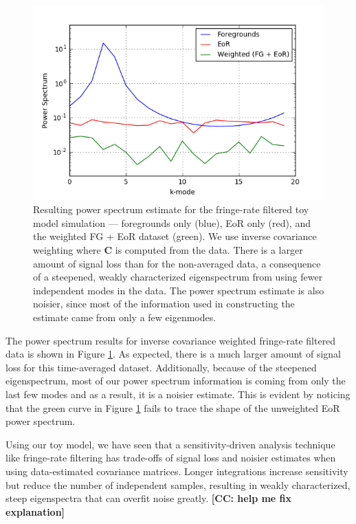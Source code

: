 \documentclass[preprint2,numberedappendix,tighten]{aastex6}  %
\newcommand{\cc}[1]{{\color{purple} \textbf{[CC: #1]}}}
\begin{document}
\begin{figure}
	\centering
	\includegraphics[trim={0.3cm 0.2cm 0.3cm 0.3cm},clip,width=\columnwidth]{plots/toy_sigloss7.png}
	\caption{Resulting power spectrum estimate for the fringe-rate filtered toy model simulation --- foregrounds only (blue), EoR only (red), and the weighted FG + EoR dataset (green). We use inverse covariance weighting where $\textbf{C}$ is computed from the data. There is a larger amount of signal loss than for the non-averaged data, a consequence of a steepened, weakly characterized eigenspectrum from using fewer independent modes in the data. The power spectrum estimate is also noisier, since most of the information used in constructing the estimate came from only a few eigenmodes.}
	\label{fig:toy_sigloss7}
\end{figure}

The power spectrum results for inverse covariance weighted fringe-rate filtered data is shown in Figure \ref{fig:toy_sigloss7}. As expected, there is a much larger amount of signal loss for this time-averaged dataset. Additionally, because of the steepened eigenspectrum, most of our power spectrum information is coming from only the last few modes and as a result, it is a noisier estimate. This is evident by noticing that the green curve in Figure \ref{fig:toy_sigloss7} fails to trace the shape of the unweighted EoR power spectrum.

Using our toy model, we have seen that a sensitivity-driven analysis technique like fringe-rate filtering has trade-offs of signal loss and noisier estimates when using data-estimated covariance matrices. Longer integrations increase sensitivity but reduce the number of independent samples, resulting in weakly characterized, steep eigenspectra that can overfit noise greatly. \cc{help me fix explanation}
\end{document}
